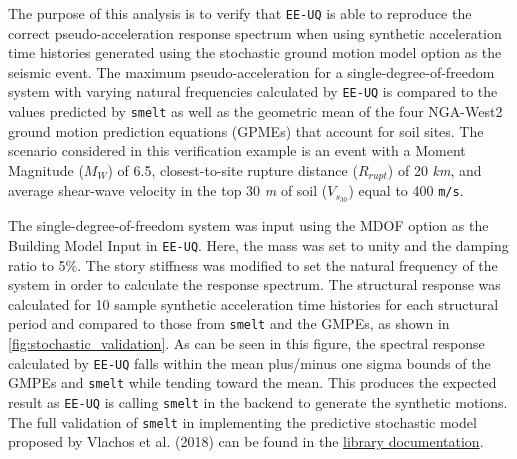 The purpose of this analysis is to verify that \texttt{EE-UQ} is able
to reproduce the correct pseudo-acceleration response spectrum when
using synthetic acceleration time histories generated using the
stochastic ground motion model option as the seismic event. The maximum
pseudo-acceleration for a single-degree-of-freedom system with varying
natural frequencies calculated by \texttt{EE-UQ} is compared to the
values predicted by \texttt{smelt} as well as the geometric mean
of the four NGA-West2 ground motion prediction equations (GPMEs)
that account for soil sites. The scenario considered in this verification
example is an event with a Moment Magnitude ($M_W$) of 6.5, closest-to-site
rupture distance ($R_{rupt}$) of 20 \textit{km}, and average shear-wave velocity in the top
30 \textit{m} of soil ($V_{s_{30}}$) equal to 400 \texttt{m/s}.

The single-degree-of-freedom system was input using the MDOF option as
the Building Model Input in \texttt{EE-UQ}. Here, the mass was set to
unity and the damping ratio to 5\%. The story stiffness was modified
to set the natural frequency of the system in order to calculate the
response spectrum. The structural response was calculated for 10
sample synthetic acceleration time histories for each structural
period and compared to those from \texttt{smelt} and the GMPEs, as
shown in \autoref{fig:stochastic_validation}. As can be seen in this
figure, the spectral response calculated by \texttt{EE-UQ} falls
within the mean plus/minus one sigma bounds of the GMPEs and
\texttt{smelt} while tending toward the mean. This produces the
expected result as \texttt{EE-UQ} is calling \texttt{smelt} in the
backend to generate the synthetic motions. The full validation of
\texttt{smelt} in implementing the predictive stochastic model
proposed by Vlachos et al. (2018) \cite{vlachos2018predictive} can be
found in the
\href{https://github.com/shellshocked2003/Stochastic-Loading-Module/blob/master/README.md}{library
  documentation}.

